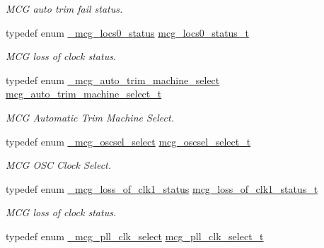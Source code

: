 \begin{DoxyCompactItemize}
\begin{DoxyCompactList}\small\item\em M\+CG auto trim fail status. \end{DoxyCompactList}\item 
typedef enum \hyperlink{group__mcg__hal_ga1d8cf5d61529774f2d79c950fa3a3132}{\+\_\+mcg\+\_\+locs0\+\_\+status} \hyperlink{group__mcg__hal_ga82a2243691b1a714edd2096ade15420f}{mcg\+\_\+locs0\+\_\+status\+\_\+t}\hypertarget{group__mcg__hal_ga82a2243691b1a714edd2096ade15420f}{}\label{group__mcg__hal_ga82a2243691b1a714edd2096ade15420f}

\begin{DoxyCompactList}\small\item\em M\+CG loss of clock status. \end{DoxyCompactList}\item 
typedef enum \hyperlink{group__mcg__hal_ga290ae258db9bd644c164aa136405dac8}{\+\_\+mcg\+\_\+auto\+\_\+trim\+\_\+machine\+\_\+select} \hyperlink{group__mcg__hal_ga8e022f61ff7c16d7184af0b5d7d58ca5}{mcg\+\_\+auto\+\_\+trim\+\_\+machine\+\_\+select\+\_\+t}\hypertarget{group__mcg__hal_ga8e022f61ff7c16d7184af0b5d7d58ca5}{}\label{group__mcg__hal_ga8e022f61ff7c16d7184af0b5d7d58ca5}

\begin{DoxyCompactList}\small\item\em M\+CG Automatic Trim Machine Select. \end{DoxyCompactList}\item 
typedef enum \hyperlink{group__mcg__hal_gae2a02e7371d9bc1cdd3227a70508ac51}{\+\_\+mcg\+\_\+oscsel\+\_\+select} \hyperlink{group__mcg__hal_ga199389ca614bebd5d3a6a32b1d5c558c}{mcg\+\_\+oscsel\+\_\+select\+\_\+t}\hypertarget{group__mcg__hal_ga199389ca614bebd5d3a6a32b1d5c558c}{}\label{group__mcg__hal_ga199389ca614bebd5d3a6a32b1d5c558c}

\begin{DoxyCompactList}\small\item\em M\+CG O\+SC Clock Select. \end{DoxyCompactList}\item 
typedef enum \hyperlink{group__mcg__hal_gaf726bc1387fab6c688fbc0e9f38fb939}{\+\_\+mcg\+\_\+loss\+\_\+of\+\_\+clk1\+\_\+status} \hyperlink{group__mcg__hal_ga896a7c8702dbfc3bdc2f8f1ce679e0c1}{mcg\+\_\+loss\+\_\+of\+\_\+clk1\+\_\+status\+\_\+t}\hypertarget{group__mcg__hal_ga896a7c8702dbfc3bdc2f8f1ce679e0c1}{}\label{group__mcg__hal_ga896a7c8702dbfc3bdc2f8f1ce679e0c1}

\begin{DoxyCompactList}\small\item\em M\+CG loss of clock status. \end{DoxyCompactList}\item 
typedef enum \hyperlink{group__mcg__hal_ga34b64ff2e935b09b3f3ae070da66b7d8}{\+\_\+mcg\+\_\+pll\+\_\+clk\+\_\+select} \hyperlink{group__mcg__hal_gabb093003f85a2f62fc0769b22daba84d}{mcg\+\_\+pll\+\_\+clk\+\_\+select\+\_\+t}\hypertarget{group__mcg__hal_gabb093003f85a2f62fc0769b22daba84d}{}\label{group__mcg__hal_gabb093003f85a2f62fc0769b22daba84d}


\end{DoxyCompactItemize}
